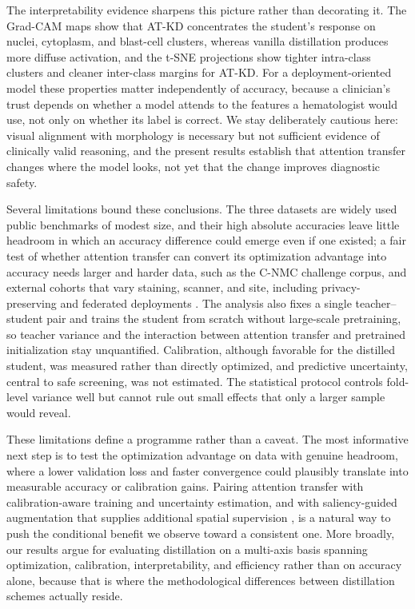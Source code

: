 \documentclass[preprint,review,12pt]{elsarticle}
\begin{document}
The interpretability evidence sharpens this picture rather than
decorating it. The Grad-CAM maps show that AT-KD concentrates the
student's response on nuclei, cytoplasm, and blast-cell clusters, whereas
vanilla distillation produces more diffuse activation, and the t-SNE
projections show tighter intra-class clusters and cleaner inter-class
margins for AT-KD. For a deployment-oriented model these properties
matter independently of accuracy, because a clinician's trust depends on
whether a model attends to the features a hematologist would use, not
only on whether its label is correct. We stay deliberately cautious here:
visual alignment with morphology is necessary but not sufficient evidence
of clinically valid reasoning, and the present results establish that
attention transfer changes where the model looks, not yet that the change
improves diagnostic safety.

Several limitations bound these conclusions. The three datasets are
widely used public benchmarks of modest size, and their high absolute
accuracies leave little headroom in which an accuracy difference could
emerge even if one existed; a fair test of whether attention transfer can
convert its optimization advantage into accuracy needs larger and harder
data, such as the C-NMC challenge corpus, and external cohorts that vary
staining, scanner, and site, including privacy-preserving and federated
deployments \cite{ref50}. The analysis also fixes a single
teacher--student pair and trains the student from scratch without
large-scale pretraining, so teacher variance and the interaction between
attention transfer and pretrained initialization stay unquantified.
Calibration, although favorable for the distilled student, was measured
rather than directly optimized, and predictive uncertainty, central to
safe screening, was not estimated. The statistical protocol controls
fold-level variance well but cannot rule out small effects that only a
larger sample would reveal.

These limitations define a programme rather than a caveat. The most
informative next step is to test the optimization advantage on data with
genuine headroom, where a lower validation loss and faster convergence
could plausibly translate into measurable accuracy or calibration gains.
Pairing attention transfer with calibration-aware training and
uncertainty estimation, and with saliency-guided augmentation that
supplies additional spatial supervision \cite{ref49}, is a natural way to
push the conditional benefit we observe toward a consistent one. More
broadly, our results argue for evaluating distillation on a multi-axis
basis spanning optimization, calibration, interpretability, and
efficiency rather than on accuracy alone, because that is where the
methodological differences between distillation schemes actually reside.
\end{document}
